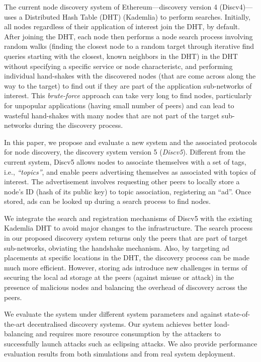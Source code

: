 The current node discovery system of Ethereum---\ie discovery version 4 (Discv4)---uses a Distributed Hash Table (DHT) (Kademlia) to perform searches. Initially, all nodes regardless of their application of interest join the DHT, by default. After joining the DHT, each node then performs a node search process involving random walks (\ie finding the closest node to a random target through iterative find queries starting with the closest, known neighbors in the DHT) in the DHT without specifying a specific service or node characteristc, and performing individual hand-shakes with the discovered nodes (that are come across along the way to the target) to find out if they are part of the application sub-networks of interest. This \emph{brute-force} approach can take very long to find nodes, particularly for unpopular applications (\ie having small number of peers) and can lead to wasteful hand-shakes with many nodes that are not part of the target sub-networks during the discovery process. 

In this paper, we propose and evaluate a new system and the associated protocols for node discovery, \ie the discovery system version 5 (\textit{Discv5}). Different from the current system, Discv5 allows nodes to associate themselves with a set of tags, i.e., \textit{``topics''}, and enable peers advertising themselves as associated with topics of interest. The advertisement involves requesting other peers to locally store a node's ID (hash of its public key) to topic association, \ie  registering an ``ad''. Once stored, ads can be looked up during a search process to find nodes. 

We integrate the search and registration mechanisms of Discv5 with the existing Kademlia DHT to avoid major changes to the infrastructure. The search process in our proposed discovery system returns only the peers that are part of target sub-networks, obviating the handshake mechanism. Also, by targeting ad placements at specific locations in the DHT, the discovery process can be made much more efficient. However, storing ads introduce new challenges in terms of securing the local ad storage at the peers (\ie against misuse or attack) in the presence of malicious nodes and balancing the overhead of discovery across the peers. 


We evaluate the system under different system parameters and against state-of-the-art decentralised discovery systems. Our system achieves better load-balancing and requires more resource consumption by the attackers to successfully launch attacks such as eclipsing attacks. We also provide performance evaluation results from both simulations and from real system deployment.  
    
